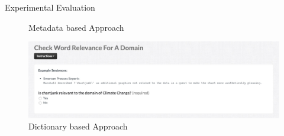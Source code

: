 \documentclass[final,hyperref={pdfpagelabels=true}]{beamer}
\begin{document}
\begin{frame}
\begin{columns}[t, onlytextwidth]
\begin{column}{\textwidth}
\begin{columns}[t, onlytextwidth]
\begin{column}{.49\textwidth}
\begin{block}{Experimental Evaluation}
\begin{minipage}[t][.2\textheight][c]{\textwidth}
\begin{minipage}[t]{0.93\textwidth}
\begin{minipage}[t]{\textwidth}
\begin{minipage}[t]{.49\textwidth}
\begin{minipage}[t]{\textwidth}
\begin{figure}[H]
											 \caption{Metadata based Approach}
										\end{figure}
									\end{minipage}
									\begin{minipage}[t]{\textwidth}
										\vspace{-1.9mm}
										\begin{figure}[H]
										 \centering
										 \includegraphics[width=\textwidth]{figures/questionaire_wordnik_example}
										 \caption{Dictionary based Approach}
										\end{figure}
									\end{minipage}
								\end{minipage}
							\end{minipage}
						\end{minipage}
						\hfill
						\hbox{}
						

\end{minipage}
\end{block}
\end{column}
\end{columns}
\end{column}
\end{columns}
\end{frame}
\end{document}
